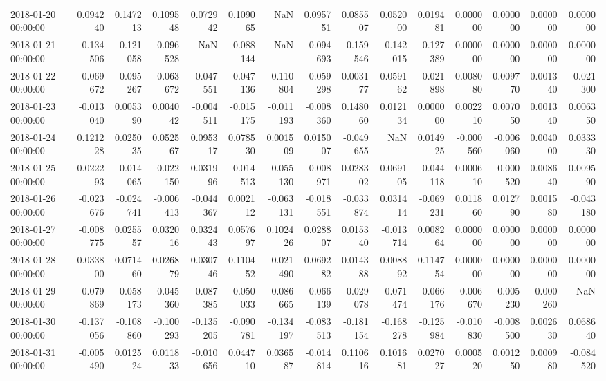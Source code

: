 \begin{tabular}{lrrrrrrrrrrrrrr}
2018-01-20 00:00:00 & 0.094240 & 0.147213 & 0.109548 & 0.072942 & 0.109065 & NaN & 0.095751 & 0.085507 & 0.052000 & 0.019481 & 0.000000 & 0.000000 & 0.000000 & 0.000000 \\
2018-01-21 00:00:00 & -0.134506 & -0.121058 & -0.096528 & NaN & -0.088144 & NaN & -0.094693 & -0.159546 & -0.142015 & -0.127389 & 0.000000 & 0.000000 & 0.000000 & 0.000000 \\
2018-01-22 00:00:00 & -0.069672 & -0.095267 & -0.063672 & -0.047551 & -0.047136 & -0.110804 & -0.059298 & 0.003177 & 0.059162 & -0.021898 & 0.008080 & 0.009770 & 0.001340 & -0.021300 \\
2018-01-23 00:00:00 & -0.013040 & 0.005390 & 0.004042 & -0.004511 & -0.015175 & -0.011193 & -0.008360 & 0.148060 & 0.012134 & 0.000000 & 0.002210 & 0.007050 & 0.001340 & 0.006350 \\
2018-01-24 00:00:00 & 0.121228 & 0.025035 & 0.052567 & 0.095317 & 0.078530 & 0.001509 & 0.015007 & -0.049655 & NaN & 0.014925 & -0.000560 & -0.006060 & 0.004000 & 0.033330 \\
2018-01-25 00:00:00 & 0.022293 & -0.014065 & -0.022150 & 0.031996 & -0.014513 & -0.055130 & -0.008971 & 0.028302 & 0.069105 & -0.044118 & 0.000610 & -0.000520 & 0.008640 & 0.009590 \\
2018-01-26 00:00:00 & -0.023676 & -0.024741 & -0.006413 & -0.044367 & 0.002112 & -0.063131 & -0.018551 & -0.033874 & 0.031414 & -0.069231 & 0.011860 & 0.012790 & 0.001580 & -0.043180 \\
2018-01-27 00:00:00 & -0.008775 & 0.025557 & 0.032016 & 0.032443 & 0.057697 & 0.102426 & 0.028807 & 0.015340 & -0.013714 & 0.008264 & 0.000000 & 0.000000 & 0.000000 & 0.000000 \\
2018-01-28 00:00:00 & 0.033800 & 0.071460 & 0.026879 & 0.030746 & 0.110452 & -0.021490 & 0.069282 & 0.014388 & 0.008892 & 0.114754 & 0.000000 & 0.000000 & 0.000000 & 0.000000 \\
2018-01-29 00:00:00 & -0.079869 & -0.058173 & -0.045360 & -0.087385 & -0.050033 & -0.086665 & -0.066139 & -0.029078 & -0.071474 & -0.066176 & -0.006670 & -0.005230 & -0.000260 & NaN \\
2018-01-30 00:00:00 & -0.137056 & -0.108860 & -0.100293 & -0.135205 & -0.090781 & -0.134197 & -0.083513 & -0.181154 & -0.168278 & -0.125984 & -0.010830 & -0.008500 & 0.002630 & 0.068640 \\
2018-01-31 00:00:00 & -0.005490 & 0.012524 & 0.011833 & -0.010656 & 0.044710 & 0.036587 & -0.014814 & 0.110616 & 0.101681 & 0.027027 & 0.000520 & 0.001250 & 0.000980 & -0.084520 \\

\end{tabular}
